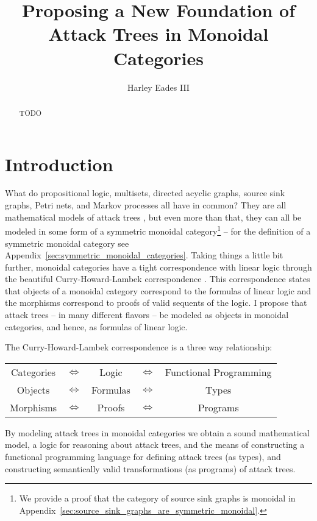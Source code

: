 \documentclass{llncs}
\date{}
\begin{document}
\title{Proposing a New Foundation of Attack Trees in Monoidal Categories}

\author{Harley Eades III}

\maketitle 

\begin{abstract}
  TODO
\end{abstract}

\section{Introduction}
\label{sec:introduction}

What do propositional logic, multisets, directed acyclic graphs,
source sink graphs, Petri nets, and Markov processes all have in
common?  They are all mathematical models of attack trees \cite{??},
but even more than that, they can all be modeled in some form of a
symmetric monoidal category\footnote{We provide a proof that the
  category of source sink graphs is monoidal in
  Appendix~\ref{sec:source_sink_graphs_are_symmetric_monoidal}.}
\cite{?} -- for the definition of a symmetric monoidal category see
Appendix~\ref{sec:symmetric_monoidal_categories}.  Taking things a
little bit further, monoidal categories have a tight correspondence
with linear logic through the beautiful Curry-Howard-Lambek
correspondence \cite{?}.  This correspondence states that objects of a
monoidal category correspond to the formulas of linear logic and the
morphisms correspond to proofs of valid sequents of the logic.  I
propose that attack trees -- in many different flavors -- be modeled
as objects in monoidal categories, and hence, as formulas of linear
logic.

The Curry-Howard-Lambek correspondence is a three way relationship:
\begin{center}
  \setlength{\tabcolsep}{7pt}
  \begin{tabular}{ccccc}
    Categories & $\iff$ & Logic    & $\iff$   & Functional Programming\\
    Objects    & $\iff$ & Formulas & $\iff$   & Types    \\
    Morphisms  & $\iff$ & Proofs   & $\iff$   & Programs 
  \end{tabular}
\end{center}
By modeling attack trees in monoidal categories we obtain a sound
mathematical model, a logic for reasoning about attack trees, and the
means of constructing a functional programming language for defining
attack trees (as types), and constructing semantically valid
transformations (as programs) of attack trees.
\end{document}
